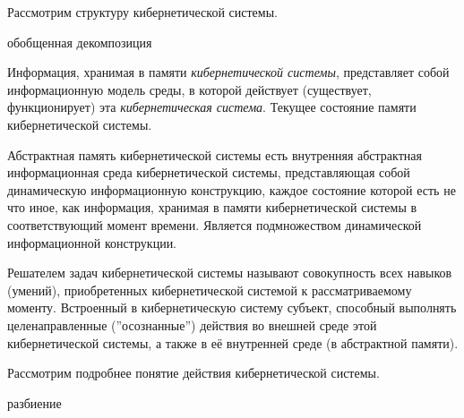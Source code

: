 
Рассмотрим структуру кибернетической системы.
\begin{SCn}
	\begin{scnrelfromset}{обобщенная декомпозиция}
	\end{scnrelfromset}
\end{SCn}

Информация, хранимая в памяти \textit{кибернетической системы}, представляет собой информационную модель среды, в которой действует (существует, функционирует) эта \textit{кибернетическая система}. Текущее состояние памяти кибернетической системы.

Абстрактная память кибернетической системы есть внутренняя абстрактная информационная среда кибернетической системы, представляющая собой динамическую информационную  конструкцию, каждое состояние которой есть не что иное, как информация, хранимая в памяти кибернетической системы в соответствующий момент времени. Является подмножеством динамической информационной конструкции.

Решателем задач кибернетической системы называют совокупность всех навыков (умений), приобретенных кибернетической системой к рассматриваемому моменту. Встроенный в кибернетическую систему субъект, способный выполнять целенаправленные (''осознанные'') действия во внешней среде этой кибернетической системы, а также в её внутренней среде (в абстрактной памяти).


Рассмотрим подробнее понятие действия кибернетической системы.

\begin{SCn}
\begin{scnrelfromset}{разбиение}
	\begin{scnindent}
	\end{scnindent}

\end{scnrelfromset}
\end{SCn}

